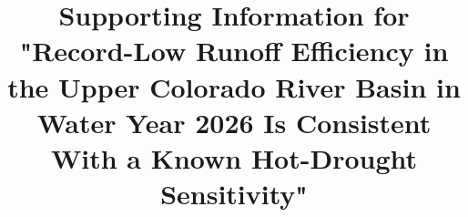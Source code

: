 \documentclass[draft,grl]{agutexSI2019}
\begin{document}
%
%

\title{Supporting Information for "Record-Low Runoff Efficiency in the Upper Colorado River Basin in Water Year 2026 Is Consistent With a Known Hot-Drought Sensitivity"}


%
%



%
%
\end{document}
